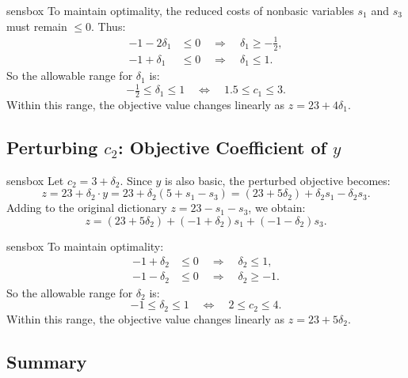 \begin{steppanel}{sensbox}
To maintain optimality, the reduced costs of nonbasic variables \( s_1 \) and \( s_3 \) must remain \( \leq 0 \). Thus:
\[
\begin{aligned}
-1 - 2\delta_1 &\leq 0 \quad \Rightarrow \quad \delta_1 \geq -\tfrac{1}{2}, \\
-1 + \delta_1 &\leq 0 \quad \Rightarrow \quad \delta_1 \leq 1.
\end{aligned}
\]
So the allowable range for \( \delta_1 \) is:
\[
\boxed{-\tfrac{1}{2} \leq \delta_1 \leq 1}
\quad\Longleftrightarrow\quad
1.5 \leq c_1 \leq 3.
\]
Within this range, the objective value changes linearly as \( z = 23 + 4\delta_1 \).
\end{steppanel}

\subsection{Perturbing \( c_2 \): Objective Coefficient of \( y \)}

\begin{steppanel}{sensbox}
Let \( c_2 = 3 + \delta_2 \). Since \( y \) is also basic, the perturbed objective becomes:
\[
z = 23 + \delta_2 \cdot y = 23 + \delta_2(5 + s_1 - s_3)
= (23 + 5\delta_2) + \delta_2 s_1 - \delta_2 s_3.
\]
Adding to the original dictionary \( z = 23 - s_1 - s_3 \), we obtain:
\[
z = (23 + 5\delta_2) + (-1 + \delta_2)s_1 + (-1 - \delta_2)s_3.
\]
\end{steppanel}

\begin{steppanel}{sensbox}
To maintain optimality:
\[
\begin{aligned}
-1 + \delta_2 &\leq 0 \quad \Rightarrow \quad \delta_2 \leq 1, \\
-1 - \delta_2 &\leq 0 \quad \Rightarrow \quad \delta_2 \geq -1.
\end{aligned}
\]
So the allowable range for \( \delta_2 \) is:
\[
\boxed{-1 \leq \delta_2 \leq 1}
\quad\Longleftrightarrow\quad
2 \leq c_2 \leq 4.
\]
Within this range, the objective value changes linearly as \( z = 23 + 5\delta_2 \).
\end{steppanel}

\subsection{Summary}

